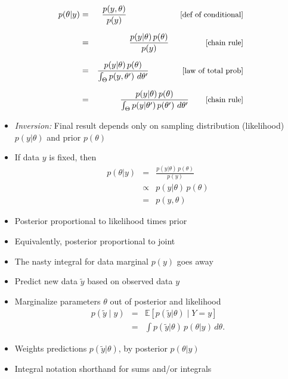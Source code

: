\documentclass[10pt]{report}
\begin{document}
%
\vspace*{-4pt}
\begin{eqnarray*}
    p(\theta|y)
    & = & \frac{p(y,\theta)}{p(y)}
          \hspace*{64pt} \text{\small [def of conditional]}
    \\[6pt]
    & = & \frac{p(y|\theta) \, p(\theta)}{p(y)}
          \hspace*{44pt} \text{\small [chain rule]}
    \\[6pt]
    & = & \frac{p(y|\theta) \, p(\theta)}{\int_{\Theta} p(y,\theta') \ d\theta'}
          \hspace*{40pt} \text{\small [law of total prob]}
    \\[6pt]
    & = & \frac{p(y|\theta) \, p(\theta)}{\int_{\Theta} p(y|\theta') \,
      p(\theta') \ d\theta'}
          \hspace*{20pt} \text{\small [chain rule]}
\end{eqnarray*}
\vfill
\begin{itemize}
\item \emph{Inversion:} Final result depends only on
  sampling distribution (likelihood) $p(y|\theta)$ and prior
  $p(\theta)$
\end{itemize}


%
\begin{itemize}
\item If data $y$ is fixed, then
\begin{eqnarray*}
p(\theta|y)
& = & \frac{p(y|\theta) \, p(\theta)}{p(y)}
\\[6pt]
& \propto & p(y|\theta) \, p(\theta)
\\[6pt]
& = & p(y,\theta)
\end{eqnarray*}
\item Posterior proportional to likelihood times prior
\item Equivalently, posterior proportional to joint
\vfill
\item The nasty integral for data marginal $p(y)$ goes away
\end{itemize}


%
\begin{itemize}
\item Predict new data $\tilde{y}$ based on observed data $y$
\item Marginalize parameters $\theta$ out of posterior and likelihood
\begin{eqnarray*}
p(\tilde{y} \mid y)
& = & \mathbb{E}[p(\tilde{y} | \theta) \mid Y = y]
\\[6pt]
& = &
\int p(\tilde{y} | \theta) \, p(\theta | y) \, d\theta.
\end{eqnarray*}
\item Weights predictions $p(\tilde{y}|\theta)$,
by posterior $p(\theta|y)$
\item Integral notation shorthand for sums and/or integrals
\end{itemize}
\end{document}
